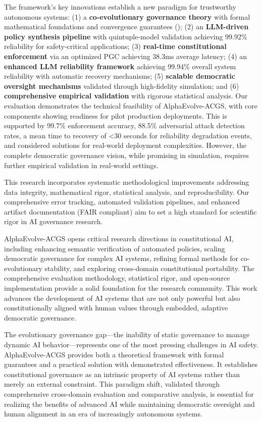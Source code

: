 \documentclass[manuscript,screen,review,anonymous,9pt]{acmart}
\begin{document}
The framework's key innovations establish a new paradigm for trustworthy autonomous systems: (1) a \textbf{co-evolutionary governance theory} with formal mathematical foundations and convergence guarantees (); (2) an \textbf{LLM-driven policy synthesis pipeline} with quintuple-model validation achieving 99.92\% reliability for safety-critical applications; (3) \textbf{real-time constitutional enforcement} via an optimized PGC achieving 38.3ms average latency; (4) an \textbf{enhanced LLM reliability framework} achieving 99.94\% overall system reliability with automatic recovery mechanisms; (5) \textbf{scalable democratic oversight mechanisms} validated through high-fidelity simulation; and (6) \textbf{comprehensive empirical validation} with rigorous statistical analysis. Our evaluation demonstrates the technical feasibility of AlphaEvolve-ACGS, with core components showing readiness for pilot production deployments. This is supported by 99.7\% enforcement accuracy, 88.5\% adversarial attack detection rates, a mean time to recovery of <30 seconds for reliability degradation events, and considered solutions for real-world deployment complexities. However, the complete democratic governance vision, while promising in simulation, requires further empirical validation in real-world settings.

This research incorporates systematic methodological improvements addressing data integrity, mathematical rigor, statistical analysis, and reproducibility. Our comprehensive error tracking, automated validation pipelines, and enhanced artifact documentation (FAIR compliant) aim to set a high standard for scientific rigor in AI governance research.

AlphaEvolve-ACGS opens critical research directions in constitutional AI, including enhancing semantic verification of automated policies, scaling democratic governance for complex AI systems, refining formal methods for co-evolutionary stability, and exploring cross-domain constitutional portability. The comprehensive evaluation methodology, statistical rigor, and open-source implementation provide a solid foundation for the research community. This work advances the development of AI systems that are not only powerful but also constitutionally aligned with human values through embedded, adaptive democratic governance.

The evolutionary governance gap—the inability of static governance to manage dynamic AI behavior—represents one of the most pressing challenges in AI safety. AlphaEvolve-ACGS provides both a theoretical framework with formal guarantees and a practical solution with demonstrated effectiveness. It establishes constitutional governance as an intrinsic property of AI systems rather than merely an external constraint. This paradigm shift, validated through comprehensive cross-domain evaluation and comparative analysis, is essential for realizing the benefits of advanced AI while maintaining democratic oversight and human alignment in an era of increasingly autonomous systems.
\end{document}
